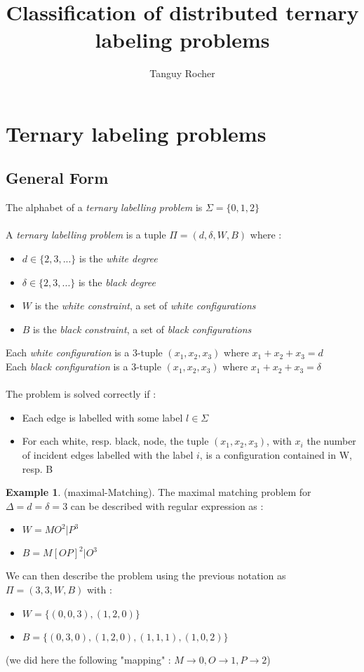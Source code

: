 \documentclass{article}
\title{Classification of distributed ternary labeling problems}
\author{Tanguy Rocher}
\theoremstyle{definition}
\newtheorem{exmp}{Example}[section]
\newcommand{\wdd}[0]{d}
\newcommand{\bdd}[0]{\delta}
\begin{document}
\maketitle

\section{Ternary labeling problems}
\subsection{General Form}
The alphabet of a \textit{ternary labelling problem} is $\Sigma = \{0,1,2\}$\\\\
A \textit{ternary labelling problem} is a tuple $\Pi = (\wdd,\bdd,W,B)$ where :
\begin{itemize}
    \item $\wdd\in\{2,3,...\}$ is the \textit{white degree}
    \item $\bdd\in\{2,3,...\}$ is the \textit{black degree}
    \item $W$ is the \textit{white constraint}, a set of \textit{white configurations}
    \item $B$ is the \textit{black constraint}, a set of \textit{black configurations}
\end{itemize}
Each \textit{white configuration} is a 3-tuple $(x_1,x_2,x_3)$ where $x_1+x_2+x_3 = \wdd$\\
Each \textit{black configuration} is a 3-tuple $(x_1,x_2,x_3)$ where $x_1+x_2+x_3 = \bdd$\\\\
The problem is solved correctly if :
\begin{itemize}
    \item Each edge is labelled with some label $l\in\Sigma$
    \item For each white, resp. black, node, the tuple $(x_1,x_2, x_3)$, with $x_i$ the number of incident edges labelled with the label $i$, is a configuration contained in W, resp. B
\end{itemize}
\begin{exmp}
(maximal-Matching). The maximal matching problem for $\Delta = \wdd = \bdd = 3$ can be described with regular expression as :
\begin{itemize}
    \item $W = MO^{2}|P^{3}$
    \item $B = M[OP]^{2}|O^{3}$
\end{itemize}
We can then describe the problem using the previous notation as
$\Pi = (3,3,W,B)$ with :
\begin{itemize}
    \item $W = \{(0,0,3),(1, 2, 0)\}$
    \item $B = \{(0,3,0),(1,2,0),(1,1,1),(1,0,2)\}$
\end{itemize}
(we did here the following "mapping" : $M\rightarrow 0, O\rightarrow 1, P\rightarrow 2$)
\end{exmp}
\end{document}
